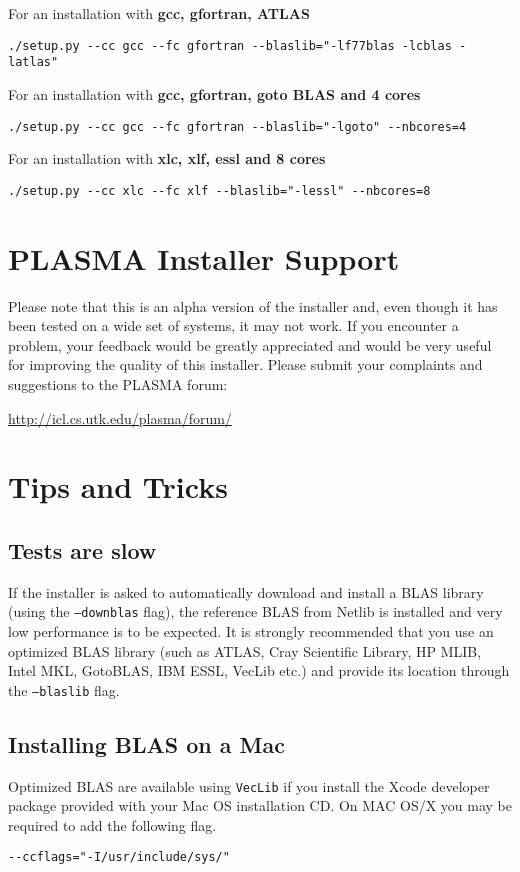 For an installation with {\bf gcc, gfortran, ATLAS}
\begin{verbatim}
./setup.py --cc gcc --fc gfortran --blaslib="-lf77blas -lcblas -latlas"
\end{verbatim}

For an installation with {\bf gcc, gfortran, goto BLAS and 4 cores}
\begin{verbatim}
./setup.py --cc gcc --fc gfortran --blaslib="-lgoto" --nbcores=4
\end{verbatim}

For an installation with {\bf xlc, xlf, essl and 8 cores}
\begin{verbatim}
./setup.py --cc xlc --fc xlf --blaslib="-lessl" --nbcores=8
\end{verbatim}


\section{PLASMA Installer Support}

Please note that this is an alpha version of the installer and, even though
it has been tested on a wide set of systems, it may not work. If you
encounter a problem, your feedback would be greatly appreciated and
would be very useful for improving the quality of this installer.
Please submit your complaints and suggestions to the PLASMA forum:
\begin{link_url}
\url{http://icl.cs.utk.edu/plasma/forum/}
\end{link_url}
              
\section{Tips and Tricks\label{tips}}

\subsection{Tests are slow}
If the installer is asked to automatically download and install a BLAS
library (using the \texttt{--downblas} flag), the reference BLAS from
Netlib is installed and very low performance is to be expected.  It is
strongly recommended that you use an optimized BLAS library (such as
ATLAS, Cray Scientific Library, HP MLIB, Intel MKL, GotoBLAS, IBM ESSL,
VecLib etc.) and provide its location
through the \texttt{--blaslib} flag.

\subsection{Installing BLAS on a Mac}
Optimized BLAS are available using \texttt{VecLib} if you install the
Xcode developer package provided with your Mac OS installation CD.  On
MAC OS/X you may be required to add the following flag.
\begin{verbatim}
--ccflags="-I/usr/include/sys/"
\end{verbatim}


